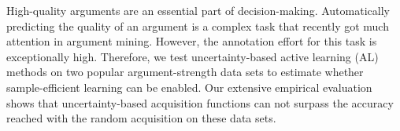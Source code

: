 High-quality arguments are an essential part of decision-making. Automatically predicting the quality of an argument is a complex task that recently got much attention in argument mining. However, the annotation effort for this task is exceptionally high. Therefore, we test uncertainty-based active learning (AL) methods on two popular argument-strength data sets to estimate whether sample-efficient learning can be enabled. Our extensive empirical evaluation shows that uncertainty-based acquisition functions can not surpass the accuracy reached with the random acquisition on these data sets.

